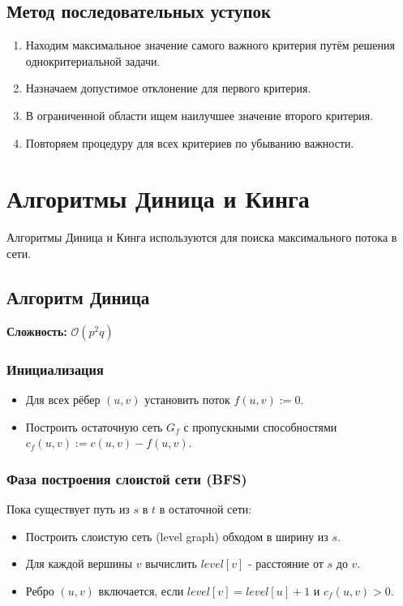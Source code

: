 {\subsection*{Метод последовательных уступок}
\begin{enumerate}
  \item Находим максимальное значение самого важного критерия путём решения однокритериальной задачи.
  \item Назначаем допустимое отклонение для первого критерия.
  \item В ограниченной области ищем наилучшее значение второго критерия.
  \item Повторяем процедуру для всех критериев по убыванию важности.
\end{enumerate}

\section*{Алгоритмы Диница и Кинга}

Алгоритмы Диница и Кинга используются для поиска максимального потока в сети.

\subsection*{Алгоритм Диница}

\textbf{Сложность:} $\mathcal{O}(p^2 q)$

\subsubsection*{Инициализация}
\begin{itemize}
  \item Для всех рёбер $(u, v)$ установить поток $f(u, v) := 0$.
  \item Построить остаточную сеть $G_f$ с пропускными способностями $c_f(u, v) := c(u, v) - f(u, v)$.
\end{itemize}

\subsubsection*{Фаза построения слоистой сети (BFS)}
Пока существует путь из $s$ в $t$ в остаточной сети:
\begin{itemize}
  \item Построить слоистую сеть (level graph) обходом в ширину из $s$.
  \item Для каждой вершины $v$ вычислить $level[v]$ - расстояние от $s$ до $v$.
  \item Ребро $(u, v)$ включается, если $level[v] = level[u] + 1$ и $c_f(u, v) > 0$.
\end{itemize}

}
